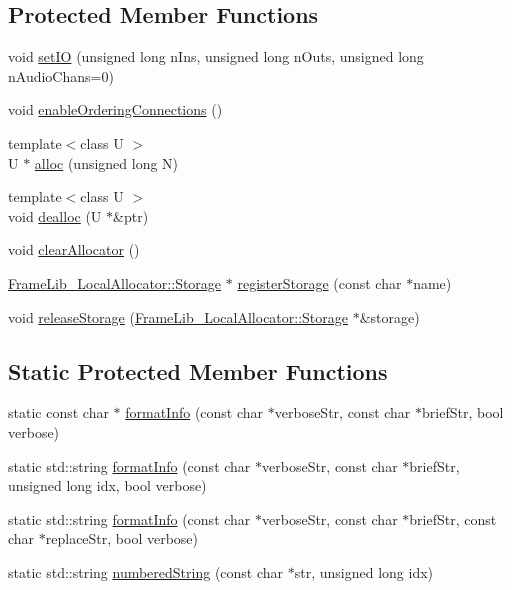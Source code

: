 \subsection*{Protected Member Functions}
\begin{DoxyCompactItemize}
\item 
void \hyperlink{class_frame_lib___object_a5c34227ace795af7da847fff3f2b300d}{set\+IO} (unsigned long n\+Ins, unsigned long n\+Outs, unsigned long n\+Audio\+Chans=0)
\item 
void \hyperlink{class_frame_lib___object_a60dba6cd7148c3223adb4197d6712839}{enable\+Ordering\+Connections} ()
\item 
{\footnotesize template$<$class U $>$ }\\U $\ast$ \hyperlink{class_frame_lib___object_a32ba9cf8b728317fc92c10310ab83e67}{alloc} (unsigned long N)
\item 
{\footnotesize template$<$class U $>$ }\\void \hyperlink{class_frame_lib___object_ab42be79621db7363ca4a34f63704d04f}{dealloc} (U $\ast$\&ptr)
\item 
void \hyperlink{class_frame_lib___object_a33b99de2c7a35227bc8a40d4c3b2ee76}{clear\+Allocator} ()
\item 
\hyperlink{class_frame_lib___local_allocator_1_1_storage}{Frame\+Lib\+\_\+\+Local\+Allocator\+::\+Storage} $\ast$ \hyperlink{class_frame_lib___object_a316d15b17757ddfef4341d0f8afe443e}{register\+Storage} (const char $\ast$name)
\item 
void \hyperlink{class_frame_lib___object_a4c131dff9d634f17696fb3ae6be06e9b}{release\+Storage} (\hyperlink{class_frame_lib___local_allocator_1_1_storage}{Frame\+Lib\+\_\+\+Local\+Allocator\+::\+Storage} $\ast$\&storage)
\end{DoxyCompactItemize}
\subsection*{Static Protected Member Functions}
\begin{DoxyCompactItemize}
\item 
static const char $\ast$ \hyperlink{class_frame_lib___object_a2cb965a15f4634a5fdddc2b009005211}{format\+Info} (const char $\ast$verbose\+Str, const char $\ast$brief\+Str, bool verbose)
\item 
static std\+::string \hyperlink{class_frame_lib___object_aa30676408b8f8161894eb0e533a8522b}{format\+Info} (const char $\ast$verbose\+Str, const char $\ast$brief\+Str, unsigned long idx, bool verbose)
\item 
static std\+::string \hyperlink{class_frame_lib___object_a7babe2dd654fbd0c8c05eb7f7ea31550}{format\+Info} (const char $\ast$verbose\+Str, const char $\ast$brief\+Str, const char $\ast$replace\+Str, bool verbose)
\item 
static std\+::string \hyperlink{class_frame_lib___object_a26307f11e68962614da4178115e665b7}{numbered\+String} (const char $\ast$str, unsigned long idx)
\end{DoxyCompactItemize}


